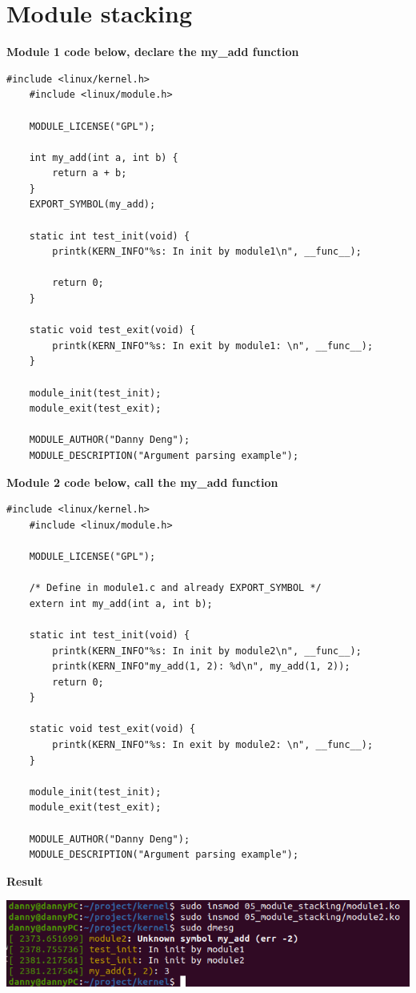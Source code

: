 \section{Module stacking}

\textbf{Module 1 code below, declare the my\_add function}
\newline
{}
\begin{lstlisting}[style=CStyle]
    #include <linux/kernel.h>
    #include <linux/module.h>
    
    MODULE_LICENSE("GPL");
    
    int my_add(int a, int b) {
        return a + b;
    }
    EXPORT_SYMBOL(my_add);
    
    static int test_init(void) {
        printk(KERN_INFO"%s: In init by module1\n", __func__);
    
        return 0;
    }
    
    static void test_exit(void) {
        printk(KERN_INFO"%s: In exit by module1: \n", __func__);
    }
    
    module_init(test_init);
    module_exit(test_exit);
    
    MODULE_AUTHOR("Danny Deng");
    MODULE_DESCRIPTION("Argument parsing example");    
\end{lstlisting}

\textbf{Module 2 code below, call the my\_add function}
\begin{lstlisting}[style=CStyle]
    #include <linux/kernel.h>
    #include <linux/module.h>

    MODULE_LICENSE("GPL");

    /* Define in module1.c and already EXPORT_SYMBOL */
    extern int my_add(int a, int b);

    static int test_init(void) {
        printk(KERN_INFO"%s: In init by module2\n", __func__);
        printk(KERN_INFO"my_add(1, 2): %d\n", my_add(1, 2));
        return 0;
    }

    static void test_exit(void) {
        printk(KERN_INFO"%s: In exit by module2: \n", __func__);
    }

    module_init(test_init);
    module_exit(test_exit);

    MODULE_AUTHOR("Danny Deng");
    MODULE_DESCRIPTION("Argument parsing example");
\end{lstlisting}




\textbf{Result}
\begin{center}
    \includegraphics[width=\linewidth]{images/05_module_stacking.png}
\end{center}

